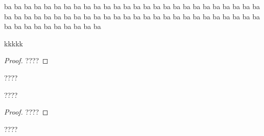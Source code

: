 \begin{theorem}[Important]
	ba ba ba ba ba ba ba ba ba ba ba ba ba ba ba ba ba ba ba ba ba ba ba ba ba ba ba ba ba ba ba ba ba ba ba ba ba ba ba ba ba ba ba ba ba ba ba ba ba ba ba ba ba ba ba ba ba ba ba ba ba ba 
	
	
	kkkkk
\end{theorem}


\begin{proof}
	????
\end{proof}


\begin{proposition}
	????
\end{proposition}


\begin{corollary}
	????
\end{corollary}


\begin{proof}
	????
\end{proof}


\begin{remark}
	????
\end{remark}
